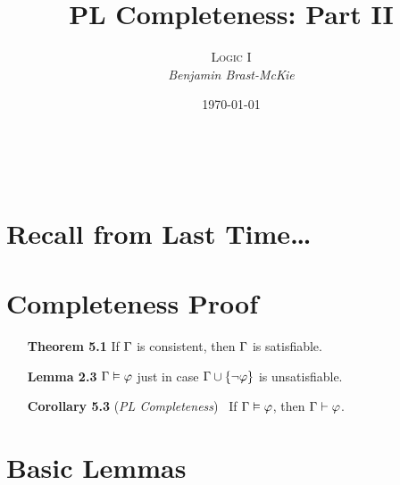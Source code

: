 \documentclass[a4paper, 11pt]{article} %
\title{\textbf{PL Completeness: Part II}} %
\author{\textsc{Logic I}\\ \em Benjamin Brast-McKie} %
\date{\today} %
\makeatletter
\renewcommand{\maketitle}{
\begin{flushright}
{\LARGE\@title}

\vspace{10pt}

{\@author}
\\ \@date
\end{flushright}

\vspace{-40pt}

}
\makeatother
\begin{document}
\maketitle %

\thispagestyle{empty}


\section*{Recall from Last Time\ldots}

\section*{Completeness Proof}

\begin{itemize}
  \item[\bf Theorem 5.1] If $\Gamma$ is consistent, then $\Gamma$ is satisfiable.
  \item[\bf Lemma 2.3] $\Gamma \vDash \varphi$ just in case $\Gamma \cup \lbrace\neg \varphi\rbrace$ is unsatisfiable. 
  \item[\bf Corollary 5.3] (\textit{PL Completeness})~ If $\Gamma\vDash\varphi$, then $\Gamma\vdash\varphi$.
\end{itemize}




\section*{Basic Lemmas}
\end{document}
